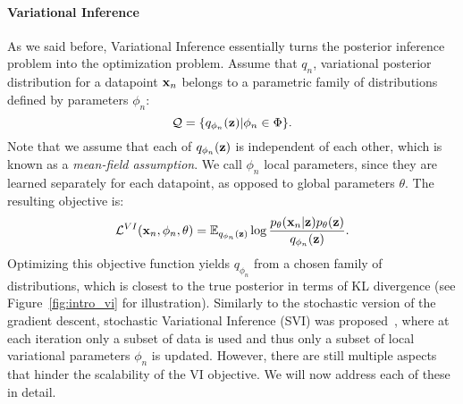 \paragraph{Variational Inference}
As we said before, Variational Inference essentially turns the posterior inference problem into the optimization problem.
Assume that $q_n$,  variational posterior distribution for a datapoint ${\mathbf{x}}_n$ belongs to a parametric family of distributions defined by parameters $\phi_n$:
\begin{equation}
    \mathcal{Q} = \{q_{\phi_n}({\mathbf{z}}) | \phi_n \in \Phi\}.
\end{equation}
Note that we assume that each of $q_{\phi_n}({\mathbf{z}})$ is independent of each other, which is known as a \textit{mean-field assumption}. We call $\phi_n$ local parameters, since they are learned separately for each datapoint, as opposed to global parameters $\theta$. The resulting objective is: 
\begin{equation}
     \mathcal{L}^{VI}({\mathbf{x}}_n, \phi_n, \theta) =  \mathbb{E}_{q_{\phi_n}({\mathbf{z}})}\log  \frac{p_{\theta}({\mathbf{x}}_n|{\mathbf{z}})p_{\theta}({\mathbf{z}})}{q_{\phi_n}({\mathbf{z}})}.
\end{equation}
Optimizing this objective function yields $q_{\phi_n}$ from a chosen family of distributions, which is closest to the true posterior in terms of KL divergence (see Figure~\ref{fig:intro_vi} for illustration). Similarly to the stochastic version of the gradient descent, stochastic Variational Inference (SVI) was proposed~\citep{hoffman2013stochastic}, where at each iteration only a subset of data is used and thus only a subset of local variational parameters $\phi_n$ is updated. 
However, there are still multiple aspects that hinder the scalability of the VI objective. We will now address each of these in detail. 
